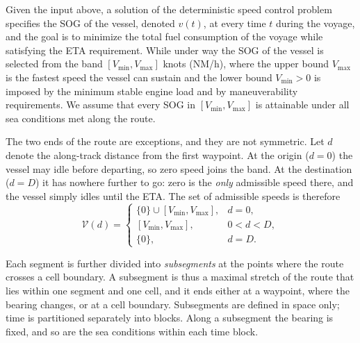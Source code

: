 \documentclass[review,authoryear]{elsarticle}
\begin{document}
Given the input above, a solution of the deterministic speed control problem specifies the SOG of the vessel, denoted $v(t)$, at every time $t$ during the voyage, and the goal is to minimize the total fuel consumption of the voyage while satisfying the ETA requirement. While under way the SOG of the vessel is selected from the band $[V_{\min}, V_{\max}]$ knots (NM/h), where the upper bound $V_{\max}$ is the fastest speed the vessel can sustain and the lower bound $V_{\min}>0$ is imposed by the minimum stable engine load and by maneuverability requirements. We assume that every SOG in $[V_{\min},V_{\max}]$ is attainable under all sea conditions met along the route. 

The two ends of the route are exceptions, and they are not symmetric.  Let $d$ denote the along-track distance from the first waypoint.  At the origin ($d=0$) the vessel may idle before departing, so zero speed joins the band. At the destination ($d=D$) it has nowhere further to go: zero is the \emph{only} admissible speed there, and the vessel simply idles until the ETA. The set of admissible speeds is therefore
\begin{equation}
	\label{eq:speed-set}
	\mathcal{V}(d)=
	\begin{cases}
		\{0\}\cup[V_{\min},V_{\max}], & d=0,\\[2pt]
		[V_{\min},V_{\max}], & 0<d<D,\\[2pt]
		\{0\}, & d=D.
	\end{cases}
\end{equation}

Each segment is further divided into \emph{subsegments} at the points where the route crosses a cell boundary. A subsegment is thus a maximal stretch of the route that lies within one segment and one cell, and it ends either at a waypoint, where the bearing changes, or at a cell boundary. Subsegments are defined in space only; time is partitioned separately into blocks. Along a subsegment the bearing is fixed, and so are the sea conditions within each time block.
\end{document}
